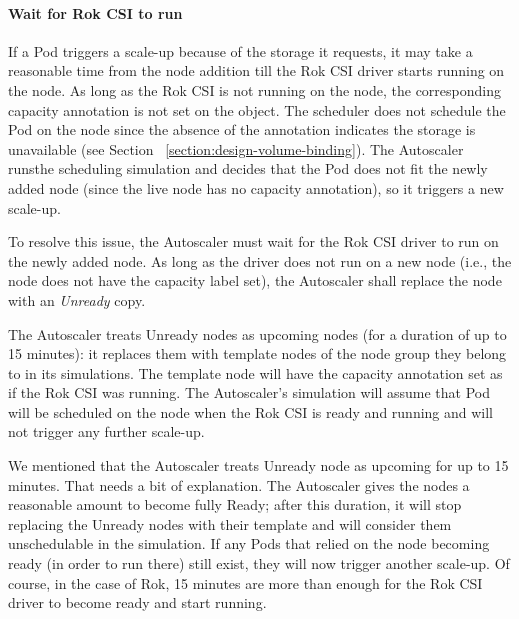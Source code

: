 \paragraph*{Wait for Rok CSI to run}

If a Pod triggers a scale-up because of the storage it requests, it may take a
reasonable time from the node addition till the Rok CSI driver starts running on
the node. As long as the Rok CSI is not running on the node, the corresponding
capacity annotation is not set on the  object. The scheduler does not
schedule the Pod on the node since the absence of the annotation indicates the
storage is unavailable (see Section ~\ref{section:design-volume-binding}). The
Autoscaler runsthe scheduling simulation and decides that the Pod does not fit
the newly added node (since the live node has no capacity annotation), so it
triggers a new scale-up.

To resolve this issue, the Autoscaler must wait for the Rok CSI driver to run on
the newly added node. As long as the driver does not run on a new node (i.e.,
the node does not have the capacity label set), the Autoscaler shall replace the
node with an \textit{Unready} copy.

The Autoscaler treats Unready nodes as upcoming nodes (for a duration of up to
15 minutes): it replaces them with template nodes of the node group they belong
to in its simulations. The template node will have the capacity annotation set
as if the Rok CSI was running. The Autoscaler's simulation will assume that Pod
will be scheduled on the node when the Rok CSI is ready and running and will not
trigger any further scale-up.

We mentioned that the Autoscaler treats Unready node as upcoming for up to 15
minutes. That needs a bit of explanation. The Autoscaler gives the nodes a
reasonable amount to become fully Ready; after this duration, it will stop
replacing the Unready nodes with their template and will consider them
unschedulable in the simulation. If any Pods that relied on the node becoming
ready (in order to run there) still exist, they will now trigger another
scale-up. Of course, in the case of Rok, 15 minutes are more than enough for the
Rok CSI driver to become ready and start running.
